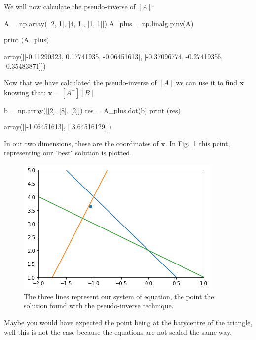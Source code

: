 We will now calculate the pseudo-inverse of \([A]\):

\begin{ipython}
A = np.array([[2, 1], [4, 1], [1, 1]])
A_plus = np.linalg.pinv(A)

print (A_plus)
\end{ipython}
\begin{ioutput}
array([[-0.11290323,  0.17741935, -0.06451613],
       [-0.37096774, -0.27419355, -0.35483871]])
\end{ioutput}

Now that we have calculated the pseudo-inverse of \([A]\) we can use it to find \(\boldsymbol{x}\) knowing that: \(\boldsymbol{x}=[A^+] [B]\)

\begin{ipython}
b = np.array([[2], [8], [2]])
res = A_plus.dot(b)
print (res)
\end{ipython}
\begin{ioutput}
array([[-1.06451613],
       [ 3.64516129]])
\end{ioutput}

In our two dimensions, these are the coordinates of \(\boldsymbol{x}\). In Fig.~\ref{fig:overdet_system} this point, representing our "best" solution is plotted.

\begin{figure}[htb]
	\centering
	\includegraphics[width=0.7\linewidth]{figures/overdet_system}
	\caption{The three lines represent our system of equation, the point 
		the solution found with the pseudo-inverse technique.}
	\label{fig:overdet_system}
\end{figure}

Maybe you would have expected the point being at the barycentre of the triangle, well this is not the case because the equations are not scaled the same way.



